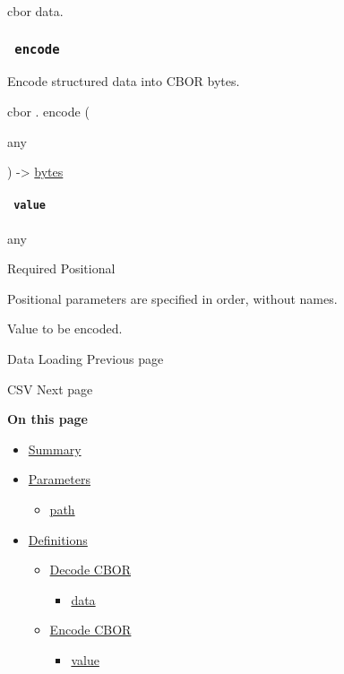 cbor data.

\subsubsection{\texorpdfstring{\texttt{\ encode\ }}{ encode }}\label{definitions-encode}

Encode structured data into CBOR bytes.

cbor { . } { encode } (

{ { any } }

) -\textgreater{} \href{/docs/reference/foundations/bytes/}{bytes}

\paragraph{\texorpdfstring{\texttt{\ value\ }}{ value }}\label{definitions-encode-value}

{ any }

{Required} {{ Positional }}

\label{definitions-encode-value-positional-tooltip}
Positional parameters are specified in order, without names.

Value to be encoded.

\href{/docs/reference/data-loading/}{\pandocbounded{}}

{ Data Loading } { Previous page }

\href{/docs/reference/data-loading/csv/}{\pandocbounded{}}

{ CSV } { Next page }

\textbf{On this page}

\begin{itemize}
\tightlist
\item
  \hyperref[summary]{Summary}
\item
  \hyperref[parameters]{Parameters}

  \begin{itemize}
  \tightlist
  \item
    \hyperref[parameters-path]{path}
  \end{itemize}
\item
  \hyperref[definitions]{Definitions}

  \begin{itemize}
  \tightlist
  \item
    \hyperref[definitions-decode]{Decode CBOR}

    \begin{itemize}
    \tightlist
    \item
      \hyperref[definitions-decode-data]{data}
    \end{itemize}
  \item
    \hyperref[definitions-encode]{Encode CBOR}

    \begin{itemize}
    \tightlist
    \item
      \hyperref[definitions-encode-value]{value}
    \end{itemize}
  \end{itemize}
\end{itemize}

